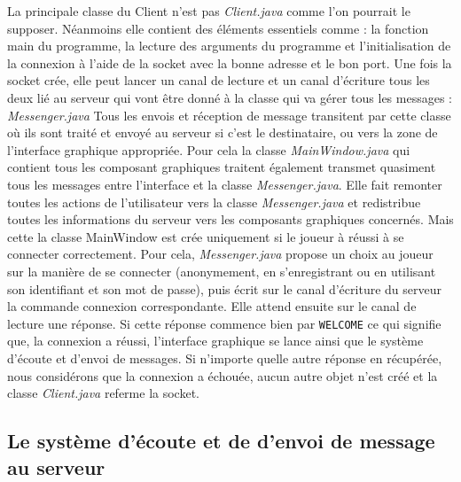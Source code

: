 \documentclass[a4paper, 11pt]{article}
\begin{document}
La principale classe du Client n'est pas \textit{Client.java} comme
l'on pourrait le supposer.  Néanmoins elle contient des éléments
essentiels comme : la fonction main du programme, la lecture des
arguments du programme et l'initialisation de la connexion à l'aide de
la socket avec la bonne adresse et le bon port. Une fois la socket
crée, elle peut lancer un canal de lecture et un canal d'écriture tous
les deux lié au serveur qui vont être donné à la classe qui va gérer
tous les messages : \textit{Messenger.java} Tous les envois et
réception de message transitent par cette classe où ils sont traité et
envoyé au serveur si c'est le destinataire, ou vers la zone de
l'interface graphique appropriée.  Pour cela la classe
\textit{MainWindow.java} qui contient tous les composant graphiques
traitent également transmet quasiment tous les messages entre
l'interface et la classe \textit{Messenger.java}. Elle fait remonter
toutes les actions de l'utilisateur vers la classe
\textit{Messenger.java} et redistribue toutes les informations du
serveur vers les composants graphiques concernés.  Mais cette la
classe MainWindow est crée uniquement si le joueur à réussi à se
connecter correctement. Pour cela, \textit{Messenger.java} propose un
choix au joueur sur la manière de se connecter (anonymement, en
s'enregistrant ou en utilisant son identifiant et son mot de passe),
puis écrit sur le canal d'écriture du serveur la commande connexion
correspondante. Elle attend ensuite sur le canal de lecture une
réponse.  Si cette réponse commence bien par \verb+WELCOME+ ce qui
signifie que, la connexion a réussi, l'interface graphique se lance
ainsi que le système d'écoute et d'envoi de messages. Si n'importe
quelle autre réponse en récupérée, nous considérons que la connexion a
échouée, aucun autre objet n'est créé et la classe
\textit{Client.java} referme la socket.


\subsection{Le système d'écoute et de d'envoi de message au serveur}
\end{document}
